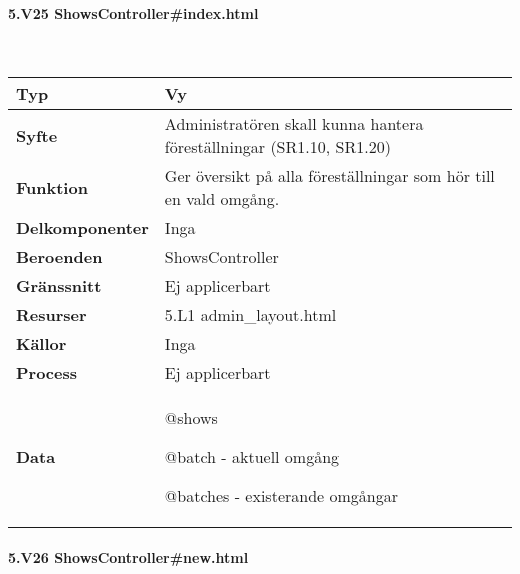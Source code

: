 \documentclass[a4paper, twoside, 11pt, titlepage]{article}
\begin{document}
			\paragraph{5.V25 ShowsController\#index.html}\

			\begin {table} [ht] \begin{tabular} {  p{3.5cm} p{11.6cm} }
				\hline
				{\sffamily\textbf{Typ}} & {Vy} \\
				\hline
				{\sffamily\textbf{Syfte}} & {Administratören skall kunna hantera föreställningar (SR1.10, SR1.20)} \\
				\hline
				{\sffamily\textbf{Funktion}} & {Ger översikt på alla föreställningar som hör till en vald omgång.} \\
				\hline
				{\sffamily\textbf{Delkomponenter}} & {Inga} \\
				\hline
				{\sffamily\textbf{Beroenden}} & {ShowsController} \\
				\hline
				{\sffamily\textbf{Gränssnitt}} & {Ej applicerbart} \\
				\hline
				{\sffamily\textbf{Resurser}} & {5.L1 admin\_layout.html} \\
				\hline
				{\sffamily\textbf{Källor}} & {Inga} \\
				\hline
				{\sffamily\textbf{Process}} & {Ej applicerbart} \\
				\hline
				{\sffamily\textbf{Data}} & {@shows

@batch - aktuell omgång

@batches - existerande omgångar} \\
				\hline
			\end{tabular} \end{table} \FloatBarrier


			\paragraph{5.V26 ShowsController\#new.html}\
\end{document}
